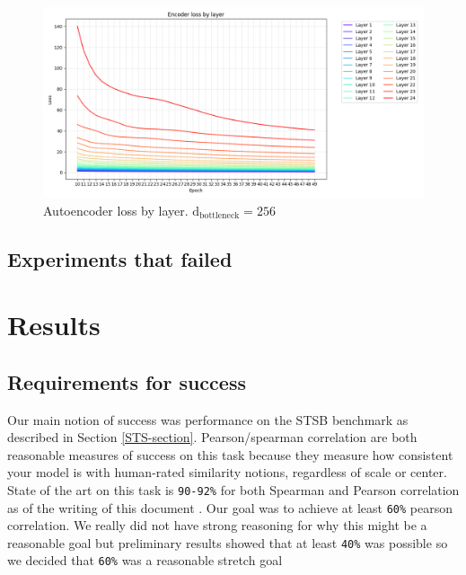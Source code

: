\documentclass{article}
\begin{document}
\begin{figure}
    \centering
    \includegraphics[width=1\linewidth]{encoder_loss.png}
    \caption{Autoencoder loss by layer. $\text{d}_\text{bottleneck} = 256$}
    \label{fig:autoencoder-loss}
\end{figure}

\subsection{Experiments that failed}



\section{Results}
\subsection{Requirements for success}
Our main notion of success was performance on the STSB \cite{STS} benchmark as described in Section \ref{STS-section}. Pearson/spearman correlation are both reasonable measures of success on this task because they measure how consistent your model is with human-rated similarity notions, regardless of scale or center. State of the art on this task is \verb|90-92%| for both Spearman and Pearson correlation as of the writing of this document \cite{muennighoff2022mteb}. Our goal was to achieve at least \verb|60%| pearson correlation. We really did not have strong reasoning for why this might be a reasonable goal but preliminary results showed that at least \verb|40%| was possible so we decided that \verb|60%| was a reasonable stretch goal
\end{document}
